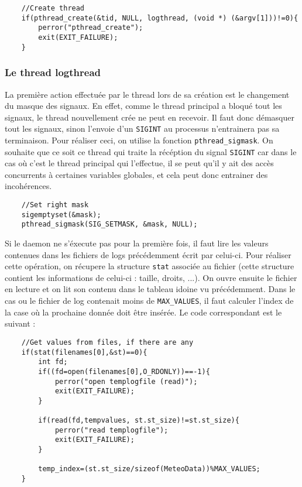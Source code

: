 \begin{DDbox}{\linewidth}
\begin{lstlisting}
	//Create thread
	if(pthread_create(&tid, NULL, logthread, (void *) (&argv[1]))!=0){
		perror("pthread_create");
		exit(EXIT_FAILURE);
	}
\end{lstlisting}
\end{DDbox}

\subsubsection{Le thread logthread}

La première action effectuée par le thread lors de sa création est le changement
du masque des signaux. En effet, comme le thread principal a bloqué tout les 
signaux, le thread nouvellement crée ne peut en recevoir. Il faut donc démasquer
tout les signaux, sinon l'envoie d'un \texttt{SIGINT} au processus n'entrainera
pas sa terminaison. Pour réaliser ceci, on utilise la fonction 
\texttt{pthread\_sigmask}. On souhaite que ce soit ce thread qui traite la 
récéption du signal \texttt{SIGINT} car dans le cas où c'est le thread principal
qui l'effectue, il se peut qu'il y ait des accès concurrents à certaines 
variables globales, et cela peut donc entrainer des incohérences. \\

\begin{DDbox}{\linewidth}
\begin{lstlisting}
  	//Set right mask
	sigemptyset(&mask);
	pthread_sigmask(SIG_SETMASK, &mask, NULL);
\end{lstlisting}
\end{DDbox}

Si le daemon ne s'éxecute pas pour la première fois, il faut lire les valeurs
contenues dans les fichiers de logs précédemment écrit par celui-ci. Pour 
réaliser cette opération, on récupere la structure \texttt{stat} associée au
fichier (cette structure contient les informations de celui-ci : taille, droits,
...). On ouvre ensuite le fichier en lecture et on lit son contenu dans le 
tableau idoine vu précédemment. Dans le cas ou le fichier de log contenait moins
de \texttt{MAX\_VALUES}, il faut calculer l'index de la case où la prochaine 
donnée doit être insérée. Le code correspondant est le suivant : \\

\begin{DDbox}{\linewidth}
\begin{lstlisting}
  	//Get values from files, if there are any
	if(stat(filenames[0],&st)==0){
		int fd;
		if((fd=open(filenames[0],O_RDONLY))==-1){
			perror("open templogfile (read)");
			exit(EXIT_FAILURE);
		}

		if(read(fd,tempvalues, st.st_size)!=st.st_size){
			perror("read templogfile");
			exit(EXIT_FAILURE);
		}

		temp_index=(st.st_size/sizeof(MeteoData))%MAX_VALUES;
	}
\end{lstlisting}
\end{DDbox}

